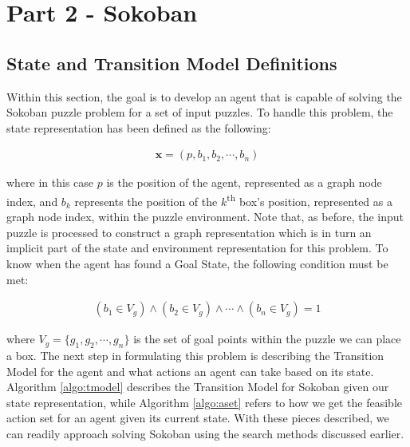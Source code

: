\documentclass{article}[12pt]
\begin{document}
   \newpage
   \section{Part 2 - Sokoban}
   \subsection{State and Transition Model Definitions}
   Within this section, the goal is to develop an agent that is capable of solving the Sokoban puzzle problem for a set of input puzzles. To handle this problem, the state representation has been defined as the following:
   
   \begin{align*}
   \boldsymbol{x} = \left( p, b_1, b_2, \cdots, b_n \right)
   \end{align*}
   
   where in this case $p$ is the position of the agent, represented as a graph node index, and $b_k$ represents the position of the $k$\textsuperscript{th} box's position, represented as a graph node index, within the puzzle environment. Note that, as before, the input puzzle is processed to construct a graph representation which is in turn an implicit part of the state and environment representation for this problem. To know when the agent has found a Goal State, the following condition must be met:
   
   \begin{align*}
   \left(b_1 \in V_g \right) \wedge \left(b_2 \in V_g \right) \wedge \cdots \wedge \left(b_n \in V_g \right) = 1
   \end{align*}
   
   where $V_g = \lbrace g_1, g_2, \cdots, g_n\rbrace$ is the set of goal points within the puzzle we can place a box. The next step in formulating this problem is describing the Transition Model for the agent and what actions an agent can take based on its state. Algorithm \ref{algo:tmodel} describes the Transition Model for Sokoban given our state representation, while Algorithm \ref{algo:aset} refers to how we get the feasible action set for an agent given its current state. With these pieces described, we can readily approach solving Sokoban using the search methods discussed earlier.
   
\end{document}
